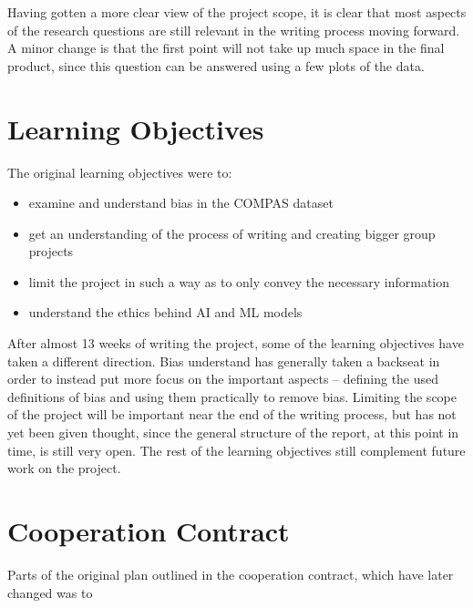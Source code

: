 \documentclass[11pt, fleqn]{article}
\begin{document}
	Having gotten a more clear view of the project scope, it is clear that most aspects of the research questions are still relevant in the writing process moving forward. A minor change is that the first point will not take up much space in the final product, since this question can be answered using a few plots of the data.
	
	\section*{Learning Objectives}
	The original learning objectives were to:
	\begin{itemize}
		\itemsep-0.1cm
		\item examine and understand bias in the COMPAS dataset
		\item get an understanding of the process of writing and creating bigger group projects
		\item limit the project in such a way as to only convey the necessary information
		\item understand the ethics behind AI and ML models
	\end{itemize}
	
	After almost 13 weeks of writing the project, some of the learning objectives have taken a different direction. Bias understand has generally taken a backseat in order to instead put more focus on the important aspects – defining the used definitions of bias and using them practically to remove bias. Limiting the scope of the project will be important near the end of the writing process, but has not yet been given thought, since the general structure of the report, at this point in time, is still very open. The rest of the learning objectives still complement future work on the project.
	
	\section*{Cooperation Contract}
	Parts of the original plan outlined in the cooperation contract, which have later changed was to
	
	
\end{document}
